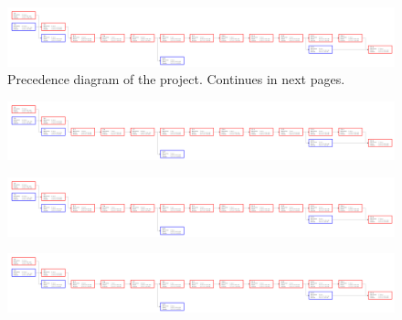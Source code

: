 \clearpage
\begin{figure}
	\centering
	\includegraphics[trim=0in 0in 26in 0in, clip, angle=90]{fig/precedence}
	\caption[Precedence diagram of the project.]{Precedence diagram of the project. Continues in
	next pages.}\label{fig:precedence}
\end{figure}
\clearpage

\begin{figure}
	\centering
	\includegraphics[trim=8.88in 0in 17in 0in, clip, angle=90]{fig/precedence}
\end{figure}
\clearpage

\begin{figure}
	\centering
	\includegraphics[trim=17.88in 0in 8in 0in, clip, angle=90]{fig/precedence}
\end{figure}
\clearpage

\begin{figure}
	\centering
	\includegraphics[trim=26.88in 0in 0in 0in, clip, angle=90]{fig/precedence}
\end{figure}
\clearpage
